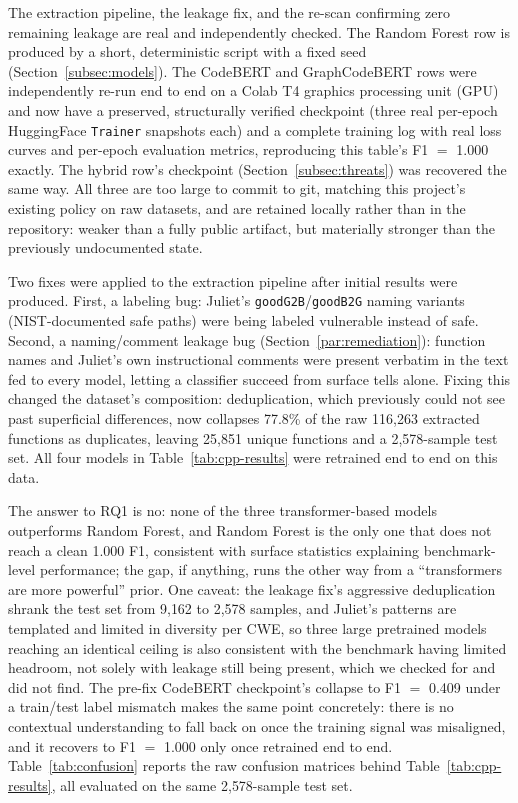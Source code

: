 \documentclass{ieeeaccess}
\begin{document}
The extraction pipeline, the leakage fix, and the re-scan confirming zero remaining leakage are real and independently checked. The Random Forest row is produced by a short, deterministic script with a fixed seed (Section~\ref{subsec:models}). The CodeBERT and GraphCodeBERT rows were independently re-run end to end on a Colab T4 graphics processing unit (GPU) and now have a preserved, structurally verified checkpoint (three real per-epoch HuggingFace \texttt{Trainer} snapshots each) and a complete training log with real loss curves and per-epoch evaluation metrics, reproducing this table's F1 $=$ 1.000 exactly. The hybrid row's checkpoint (Section~\ref{subsec:threats}) was recovered the same way. All three are too large to commit to git, matching this project's existing policy on raw datasets, and are retained locally rather than in the repository: weaker than a fully public artifact, but materially stronger than the previously undocumented state.

Two fixes were applied to the extraction pipeline after initial results were produced. First, a labeling bug: Juliet's \texttt{goodG2B}/\texttt{goodB2G} naming variants (NIST-documented safe paths) were being labeled vulnerable instead of safe. Second, a naming/comment leakage bug (Section~\ref{par:remediation}): function names and Juliet's own instructional comments were present verbatim in the text fed to every model, letting a classifier succeed from surface tells alone. Fixing this changed the dataset's composition: deduplication, which previously could not see past superficial differences, now collapses 77.8\% of the raw 116{,}263 extracted functions as duplicates, leaving 25{,}851 unique functions and a 2{,}578-sample test set. All four models in Table~\ref{tab:cpp-results} were retrained end to end on this data.

The answer to RQ1 is no: none of the three transformer-based models outperforms Random Forest, and Random Forest is the only one that does not reach a clean 1.000 F1, consistent with surface statistics explaining benchmark-level performance; the gap, if anything, runs the other way from a ``transformers are more powerful'' prior. One caveat: the leakage fix's aggressive deduplication shrank the test set from 9{,}162 to 2{,}578 samples, and Juliet's patterns are templated and limited in diversity per CWE, so three large pretrained models reaching an identical ceiling is also consistent with the benchmark having limited headroom, not solely with leakage still being present, which we checked for and did not find. The pre-fix CodeBERT checkpoint's collapse to F1 $=$ 0.409 under a train/test label mismatch makes the same point concretely: there is no contextual understanding to fall back on once the training signal was misaligned, and it recovers to F1 $=$ 1.000 only once retrained end to end. Table~\ref{tab:confusion} reports the raw confusion matrices behind Table~\ref{tab:cpp-results}, all evaluated on the same 2{,}578-sample test set.
\end{document}
